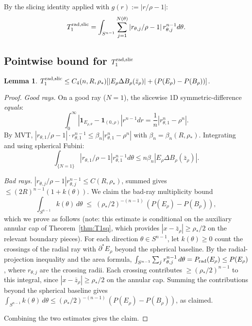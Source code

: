 \documentclass[11pt]{article}
\newtheorem{lemma}[theorem]{Lemma}
\theoremstyle{definition}
\newcommand{\rstar}{\rho_{*}}
\newcommand{\zbar}{\bar z_{\rho}}
\begin{document}
By the slicing identity \cite[Thm 18.11]{Maggi2012} applied with
$g(r):=|r/\rho-1|$:
\begin{equation}\label{eq:S1}
   T_1^{\rm rad,slic} = \int_{S^{n-1}}\sum_{j=1}^{N(\theta)}|r_{\theta,j}/\rho-1|\,r_{\theta,j}^{n-1}d\theta.
\end{equation}

\subsection{Pointwise bound for $T_1^{\rm rad,slic}$}

\begin{lemma}\label{lem:T1rad}
$T_1^{\rm rad,slic}\le C_4(n,R,\rstar)[|E_\rho\Delta B_\rho(\zbar)|+(P(E_\rho)-P(B_\rho))]$.
\end{lemma}

\begin{proof}
\emph{Good rays.} On a good ray ($N=1$), the slicewise 1D
symmetric-difference \emph{equals}:
\begin{equation}\label{eq:eq-slicewise}
   \int_0^\infty|\mathbf 1_{E_{\rho,\theta}}-\mathbf 1_{(0,\rho)}|r^{n-1}dr
   = \frac{1}{n}|r_{\theta,1}^n-\rho^n|.
\end{equation}
By MVT, $|r_{\theta,1}/\rho-1|\cdot r_{\theta,1}^{n-1}\le\beta_n|r_{\theta,1}^n-\rho^n|$
with $\beta_n=\beta_n(R,\rstar)$. Integrating and using spherical Fubini:
\[
   \int_{\{N=1\}}|r_{\theta,1}/\rho-1|r_{\theta,1}^{n-1}d\theta \le n\beta_n|E_\rho\Delta B_\rho(\zbar)|.
\]

\emph{Bad rays.} $|r_{\theta,j}/\rho-1|r_{\theta,j}^{n-1}\le C(R,\rstar)$,
summed gives $\le (2R)^{n-1}(1+k(\theta))$. We claim the bad-ray
multiplicity bound
\[
   \int_{S^{n-1}} k(\theta)\,d\theta
   \;\le\; (\rstar/2)^{-(n-1)}\,(P(E_\rho)-P(B_\rho)),
\]
which we prove as follows (note: this estimate is conditional on the
auxiliary annular cap of Theorem~\ref{thm:T1sq}, which provides
$|x-\zbar|\ge\rstar/2$ on the relevant boundary pieces). For each
direction $\theta\in S^{n-1}$, let $k(\theta)\ge 0$ count the crossings
of the radial ray with $\partial^*E_\rho$ beyond the spherical baseline.
By the radial-projection inequality and the area formula,
$\int_{S^{n-1}}\sum_j r_{\theta,j}^{n-1}\,d\theta = P_{\rm rad}(E_\rho)
\le P(E_\rho)$, where $r_{\theta,j}$ are the crossing radii. Each
crossing contributes $\ge(\rstar/2)^{n-1}$ to this integral, since
$|x-\zbar|\ge\rstar/2$ on the annular cap. Summing the contributions
beyond the spherical baseline gives
$\int_{S^{n-1}}k(\theta)\,d\theta \le (\rstar/2)^{-(n-1)}\,
(P(E_\rho)-P(B_\rho))$, as claimed.

Combining the two estimates gives the claim.
\end{proof}
\end{document}
